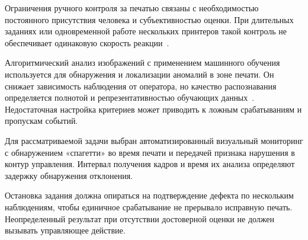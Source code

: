 Ограничения ручного контроля за печатью связаны с необходимостью постоянного присутствия человека и субъективностью оценки. При длительных заданиях или одновременной работе нескольких принтеров такой контроль не обеспечивает одинаковую скорость реакции~\cite{ивашкова2017анализ}.

Алгоритмический анализ изображений с применением машинного обучения используется для обнаружения и локализации аномалий в зоне печати. Он снижает зависимость наблюдения от оператора, но качество распознавания определяется полнотой и репрезентативностью обучающих данных~\cite{сеничев2020сравнение}. Недостаточная настройка критериев может приводить к ложным срабатываниям и пропускам событий.

Для рассматриваемой задачи выбран автоматизированный визуальный мониторинг с обнаружением «спагетти» во время печати и передачей признака нарушения в контур управления. Интервал получения кадров и время их анализа определяют задержку обнаружения отклонения.

Остановка задания должна опираться на подтверждение дефекта по нескольким наблюдениям, чтобы единичное срабатывание не прерывало исправную печать. Неопределенный результат при отсутствии достоверной оценки не должен вызывать управляющее действие.

